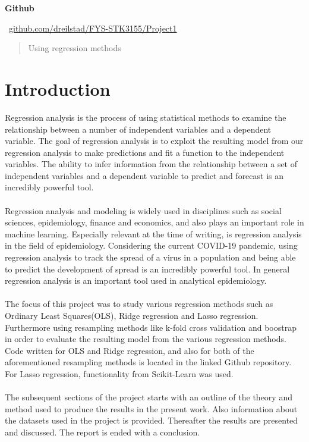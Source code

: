 \documentclass[oneside,10pt]{article}
\begin{document}
\begin{center}
    \small \textbf{Github}
    
    \vspace{0.2cm}
    
    \faGithub \ \small \href{https://github.com/dreilstad/FYS-STK3155/tree/master/Project1}{github.com/dreilstad/FYS-STK3155/Project1}
\end{center}
\vspace{0.5cm}
\begin{abstract}
    Using regression methods
\end{abstract}
\section{Introduction}
Regression analysis is the process of using statistical methods to examine the relationship between a number of independent variables and a dependent variable. The goal of regression analysis is to exploit the resulting model from our regression analysis to make predictions and fit a function to the independent variables. The ability to infer information from the relationship between a set of independent variables and a dependent variable to predict and forecast is an incredibly powerful tool.\\
\\
Regression analysis and modeling is widely used in disciplines such as social sciences, epidemiology, finance and economics, and also plays an important role in machine learning. Especially relevant at the time of writing, is regression analysis in the field of epidemiology. Considering the current COVID-19 pandemic, using regression analysis to track the spread of a virus in a population and being able to predict the development of spread is an incredibly powerful tool. In general regression analysis is an important tool used in analytical epidemiology.\cite{epidemiology}\\
\\
The focus of this project was to study various regression methods such as Ordinary Least Squares(OLS), Ridge regression and Lasso regression. Furthermore using resampling methods like k-fold cross validation and boostrap in order to evaluate the resulting model from the various regression methods. Code written for OLS and Ridge regression, and also for both of the aforementioned resampling methods is located in the linked Github repository. For Lasso regression, functionality from Scikit-Learn was used. \\
\\
The subsequent sections of the project starts with an outline of the theory and method used to produce the results in the present work. Also information about the datasets used in the project is provided. Thereafter the results are presented and discussed. The report is ended with a conclusion.
\end{document}
